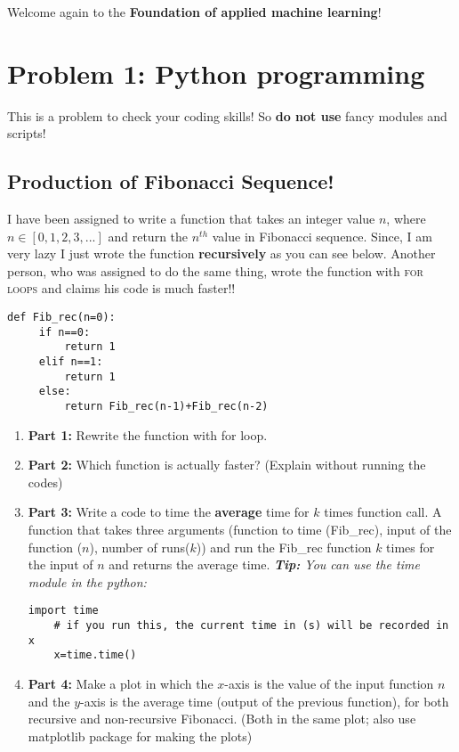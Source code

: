 \documentclass[12pt,letterpaper]{article}
\begin{document}
Welcome again to the \textbf{Foundation of applied machine learning}! 

\section*{Problem 1: Python programming}
This is a problem to check your coding skills! So \textbf{do not use} fancy modules and scripts!  

\subsection*{Production of Fibonacci Sequence!}
I have been assigned to write a function that takes an integer value $n$, where $n\in [0,1,2,3,...]$ and return the $n^{th}$ value in Fibonacci sequence. Since, I am very lazy I just wrote the function \textbf{recursively} as you can see below. Another person, who was assigned to do the same thing, wrote the function with \textsc{for loops} and claims his code is much faster!! 

     \begin{lstlisting}[style = Python]
     def Fib_rec(n=0):
     if n==0:
         return 1
     elif n==1:
         return 1
     else:
         return Fib_rec(n-1)+Fib_rec(n-2)
    \end{lstlisting}


\begin{enumerate}
  \item
   \textbf{Part 1:} Rewrite the function with for loop.
  \item
   \textbf{Part 2:} Which function is actually faster? (Explain without running the codes)
  \item
   \textbf{Part 3:} Write a code to time the \textbf{average} time for $k$ times function call. A function that takes three arguments (function to time (Fib\_rec), input of the function ($n$), number of runs($k$)) and run the Fib\_rec function $k$ times for the input of $n$ and returns the average time.
   \textit{\textbf{Tip:} You can use the time module in the python:}
    \begin{lstlisting}[style = Python]
    import time
    # if you run this, the current time in (s) will be recorded in  x
    x=time.time() 
    \end{lstlisting}
  \item
   \textbf{Part 4:} Make a plot in which the $x$-axis is the value of the input function $n$ and the $y$-axis is the average time (output of the previous function), for both recursive and non-recursive Fibonacci. (Both in the same plot; also use matplotlib package for making the plots) 
\end{enumerate}
\end{document}

